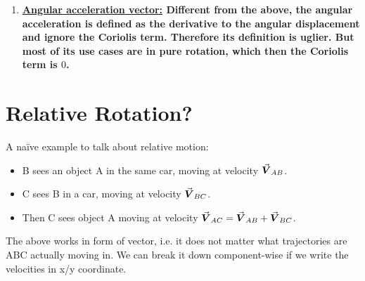 \documentclass[class=article, crop=false, 12pt]{standalone}
\begin{document}
\begin{enumerate}
    \item \bf{\ul{Angular acceleration vector:}}
    Different from the above, the angular acceleration is defined as the  derivative to the angular displacement and ignore the Coriolis term. 
    Therefore its definition is uglier. But most of its use cases are in pure rotation, which then the Coriolis term is $0$.
\end{enumerate}



\linesep
\section{Relative Rotation?}

A naïve example to talk about relative motion:
\begin{itemize}
    \item B sees an object A in the same car, moving at velocity $\va*{V}_{AB}$. 
    \item C sees B in a car, moving at velocity $\va*{V}_{BC}$.
    \item Then C sees object A moving at velocity $\va*{V}_{AC}=\va*{V}_{AB}+\va*{V}_{BC}$. 
\end{itemize}



The above works in form of vector, 
i.e. it does not matter what trajectories are ABC actually moving in.
We can break it down component-wise if we write the velocities in x/y coordinate.
\end{document}
